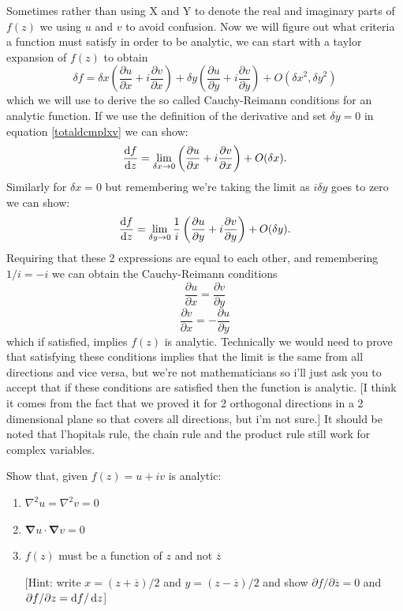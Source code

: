  Sometimes rather than using X and Y to denote the real and imaginary parts of $f(z)$ we using $u$ and $v$ to avoid confusion.
  Now we will figure out what criteria a function must satisfy in order to be analytic, we can start with a taylor expansion of $f(z)$ to obtain
 \begin{equation}
 \label{totaldcmplxv}
 \delta f=\delta x \left(\frac{\partial u}{\partial x} + i \frac{\partial v}{\partial x}\right) + \delta y \left(\frac{\partial u}{\partial y}+i\frac{\partial v}{\partial y}\right) + O\left({\delta x}^2,{\delta y}^2\right)
 \end{equation}
 which we will use to derive the so called Cauchy-Reimann conditions for an analytic function. If we use the definition of the derivative and set $\delta y=0$ in equation \ref{totaldcmplxv} we can show:
 \begin{equation*}
 \frac{\mathop{}\!\mathrm{d} f}{\mathop{}\!\mathrm{d} z}=\lim_{\delta x\to 0}\left(\frac{\partial u}{\partial x} + i \frac{\partial v}{\partial x}\right) + O(\delta x).
 \end{equation*}
Similarly for $\delta x=0$ but remembering we're taking the limit as $i\delta y$ goes to zero we can show:
%
\begin{equation*}
\frac{\mathop{}\!\mathrm{d} f}{\mathop{}\!\mathrm{d} z}=\lim_{\delta y\to 0}\frac{1}{i}\left(\frac{\partial u}{\partial y} + i \frac{\partial v}{\partial y}\right) + O(\delta y).
\end{equation*}
%
Requiring that these 2 expressions are equal to each other, and remembering $1/i=-i$ we can obtain the Cauchy-Reimann conditions
%
\begin{equation}
\frac{\partial u}{\partial x}=\frac{\partial v}{\partial y}
\end{equation}
\begin{equation*}
\frac{\partial v}{\partial x}=-\frac{\partial u}{\partial y} 
\end{equation*}
%
which if satisfied, implies $f(z)$ is analytic.
 Technically we would need to prove that satisfying these conditions implies that the limit is the same from all directions and vice versa, but we're not mathematicians so i'll just ask you to accept that if these conditions are satisfied then the function is analytic. 
[I think it comes from the fact that we proved it for 2 orthogonal directions in a 2 dimensional plane so that covers all directions, but i'm not sure.] It should be noted that l'hopitals rule, the chain rule and the product rule still work for complex variables.
%
%
\begin{examples}
	Show that, given $f(z)=u+iv$ is analytic:
	\begin{enumerate}
		\item $\nabla^2u=\nabla^2v=0$
		\item $\pmb{\nabla} u \cdot \pmb{\nabla} v=0$
		\item $f(z)$ must be a function of $z$ and not $\overline{z}$
		
		[Hint: write $x=(z+\overline{z})/2$ and $y=(z-\overline{z})/2$ and show $\partial f/\partial \overline{z}=0$ and $\partial f/\partial z=\mathop{}\!\mathrm{d} f/\mathop{}\!\mathrm{d} z$]
	\end{enumerate}
\end{examples}
